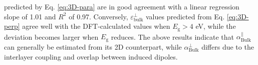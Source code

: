 \documentclass[journal=ancac3,manuscript=article,email=true,hyperref=true,keywords=false]{achemso}
\begin{document}
predicted by Eq. \ref{eq:3D-para} are in good agreement with a linear
regression slope of 1.01 and $R^2$ of 0.97. Conversely,
$\varepsilon_{\mathrm{bulk}}^{\perp}$ values predicted from
Eq. \ref{eq:3D-perp} agree well with the DFT-calculated values when
$E_{\mathrm{g}}>4$ eV, while the deviation becomes larger when
$E_{\mathrm{g}}$ reduces. The above results indicate that
$\alpha^{\parallel}_{\mathrm{Bulk}}$ can generally be estimated from
its 2D counterpart, while $\alpha^{\perp}_{\mathrm{Bulk}}$ differs due
to the interlayer coupling and overlap between induced
dipoles\cite{Andersen_2015_dielec_vdWH,Laturia_2018}. 
\end{document}
